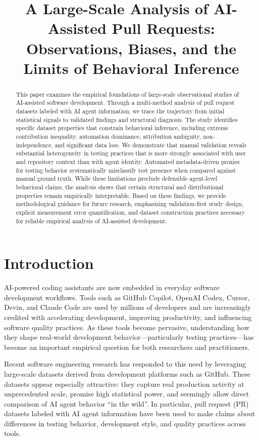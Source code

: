 \documentclass[conference]{IEEEtran}
\title{A Large-Scale Analysis of AI-Assisted Pull Requests: Observations, Biases, and the Limits of Behavioral Inference}
\begin{document}
\maketitle

\begin{abstract}
This paper examines the empirical foundations of large-scale observational studies of AI-assisted software development. Through a multi-method analysis of pull request datasets labeled with AI agent information, we trace the trajectory from initial statistical signals to validated findings and structural diagnosis. The study identifies specific dataset properties that constrain behavioral inference, including extreme contribution inequality, automation dominance, attribution ambiguity, non-independence, and significant data loss. We demonstrate that manual validation reveals substantial heterogeneity in testing practices that is more strongly associated with user and repository context than with agent identity. Automated metadata-driven proxies for testing behavior systematically misclassify test presence when compared against manual ground truth. While these limitations preclude defensible agent-level behavioral claims, the analysis shows that certain structural and distributional properties remain empirically interpretable. Based on these findings, we provide methodological guidance for future research, emphasizing validation-first study design, explicit measurement error quantification, and dataset construction practices necessary for reliable empirical analysis of AI-assisted development.
\end{abstract}


\section{Introduction}
AI-powered coding assistants are now embedded in everyday software development workflows. Tools such as GitHub Copilot, OpenAI Codex, Cursor, Devin, and Claude Code are used by millions of developers and are increasingly credited with accelerating development, improving productivity, and influencing software quality practices. As these tools become pervasive, understanding how they shape real-world development behavior—particularly testing practices—has become an important empirical question for both researchers and practitioners.

Recent software engineering research has responded to this need by leveraging large-scale datasets derived from development platforms such as GitHub. These datasets appear especially attractive: they capture real production activity at unprecedented scale, promise high statistical power, and seemingly allow direct comparison of AI agent behavior ``in the wild''. In particular, pull request (PR) datasets labeled with AI agent information have been used to make claims about differences in testing behavior, development style, and quality practices across tools.
\end{document}
